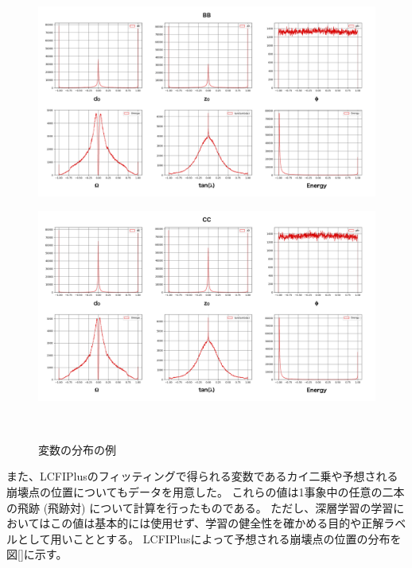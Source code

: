\begin{figure}[h]
  \begin{minipage}{1.0\textwidth}
  \centering
   \begin{minipage}{0.48\textwidth}
   \centering
    \includegraphics[width=1.0\textwidth, clip]{Figure/3Networks/3-1-2-2ReshapedVariablesBB.png}
    \label{3-1-2-2ReshapedVariablesBB}
   \end{minipage}
   \begin{minipage}{0.48\textwidth}
   \centering
    \includegraphics[width=1.0\textwidth, clip]{Figure/3Networks/3-1-2-2ReshapedVariablesCC.png}
    \label{3-1-2-2ReshapedVariablesCC}
   \end{minipage}
   \end{minipage}
  \caption{変数の分布の例}
  \label{3-1-2-2Variables}
\end{figure}

また、LCFIPlusのフィッティングで得られる変数であるカイ二乗や予想される崩壊点の位置についてもデータを用意した。
これらの値は1事象中の任意の二本の飛跡 (飛跡対) について計算を行ったものである。
ただし、深層学習の学習においてはこの値は基本的には使用せず、学習の健全性を確かめる目的や正解ラベルとして用いこととする。
LCFIPlusによって予想される崩壊点の位置の分布を図\ref{}に示す。

